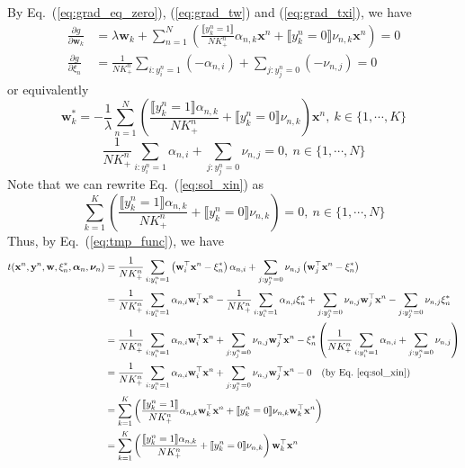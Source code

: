 \documentclass[9pt]{extarticle}
\newcommand{\llb}{\llbracket}
\newcommand{\rrb}{\rrbracket}
\newcommand{\x}{\mathbf{x}}
\newcommand{\y}{\mathbf{y}}
\newcommand{\1}{\mathbf{1}}
\newcommand{\w}{\mathbf{w}}
\newcommand{\alphabm}{\bm{\alpha}}
\newcommand{\nubm}{\bm{\nu}}
\begin{document}
%
By Eq.~(\ref{eq:grad_eq_zero}), (\ref{eq:grad_tw}) and (\ref{eq:grad_txi}), we have
\begin{equation}
\begin{aligned}
\frac{\partial g}{\partial \w_k} 
&= \lambda \w_k + \sum_{n=1}^N \left( \frac{\llb y_k^n=1 \rrb}{N K_+^n} \alpha_{n,k} \x^n + \llb y_k^n=0 \rrb \nu_{n,k} \x^n \right) = 0\\
\frac{\partial g}{\partial \xi_n} 
&= \frac{1}{N K_+^n} \sum_{i:y_i^n=1} (-\alpha_{n,i}) + \sum_{j:y_j^n=0} (-\nu_{n,j}) = 0
\end{aligned}
\end{equation}
%
or equivalently
\begin{equation}
\label{eq:sol_wk}
\w_k^* = -\frac{1}{\lambda} \sum_{n=1}^N \left( \frac{\llb y_k^n=1 \rrb \alpha_{n,k}}{N K_+^n} + \llb y_k^n=0 \rrb \nu_{n,k} \right) \x^n, \ k \in \{1,\cdots,K\}
\end{equation}
\begin{equation}
\label{eq:sol_xin}
\frac{1}{N K_+^n} \sum_{i:y_i^n=1} \alpha_{n,i} + \sum_{j:y_j^n=0} \nu_{n,j} = 0, \ n \in \{1,\cdots,N\}
\end{equation}
%
Note that we can rewrite Eq.~(\ref{eq:sol_xin}) as
\begin{equation}
\label{eq:sol_xin2}
\sum_{k=1}^K \left( \frac{\llb y_k^n=1 \rrb \alpha_{n,k}} {N K_+^n} + \llb y_k^n=0 \rrb \nu_{n,k} \right) = 0, \ n \in \{1,\cdots,N\}
\end{equation}
%
Thus, by Eq.~(\ref{eq:tmp_func}), we have
\begin{align*}
t(\x^n, \y^n, \w, \xi_n^*, \alphabm_n, \nubm_n) 
&= \frac{1}{N K_+^n} \sum_{i:y_i^n=1} \left( \w_i^\top \x^n - \xi_n^* \right) \alpha_{n,i} + \sum_{j:y_j^n=0} \nu_{n,j} \left( \w_j^\top \x^n - \xi_n^* \right) \\
&= \frac{1}{N K_+^n} \sum_{i:y_i^n=1} \alpha_{n,i} \w_i^\top \x^n - \frac{1}{N K_+^n} \sum_{i:y_i^n=1} \alpha_{n,i} \xi_n^* +
   \sum_{j:y_j^n=0} \nu_{n,j} \w_j^\top \x^n - \sum_{j:y_j^n=0} \nu_{n,j} \xi_n^* \\
&= \frac{1}{N K_+^n} \sum_{i:y_i^n=1} \alpha_{n,i} \w_i^\top \x^n + \sum_{j:y_j^n=0} \nu_{n,j} \w_j^\top \x^n -
   \xi_n^* \left( \frac{1}{N K_+^n} \sum_{i:y_i^n=1} \alpha_{n,i} + \sum_{j:y_j^n=0} \nu_{n,j} \right) \\
&= \frac{1}{N K_+^n} \sum_{i:y_i^n=1} \alpha_{n,i} \w_i^\top \x^n + \sum_{j:y_j^n=0} \nu_{n,j} \w_j^\top \x^n - 0 \quad 
   \text{(by Eq.~\ref{eq:sol_xin})} \\
&= \sum_{k=1}^K \left( \frac{\llb y_k^n=1 \rrb}{N K_+^n} \alpha_{n,k} \w_k^\top \x^n + \llb y_k^n=0 \rrb \nu_{n,k} \w_k^\top \x^n \right) \\ 
&= \sum_{k=1}^K \left( \frac{\llb y_k^n=1 \rrb \alpha_{n,k}}{N K_+^n} + \llb y_k^n=0 \rrb \nu_{n,k} \right) \w_k^\top \x^n 
\end{align*}
\end{document}
